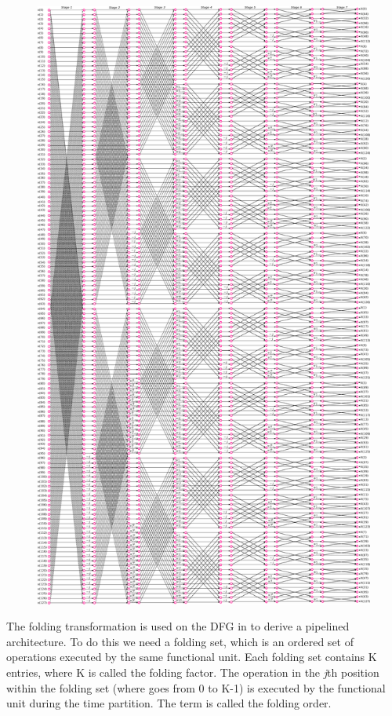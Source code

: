 \documentclass[journal,comsoc]{IEEEtran}
\begin{document}
\begin{figure}[htbp]
	\centering
	\includegraphics[width=\linewidth]{Diagramas/miSeccionFiguras/128PuntosRadix8Conexion.pdf}
	\caption{}
	\label{fig:128puntosradix8conexion}
\end{figure}


The folding transformation is used on the DFG in to derive a pipelined architecture. To do this we need a folding set, which is an ordered set of operations executed by the same functional unit. Each folding set contains K entries, where K is called the folding factor. The operation in the \textit{j}th position within the folding set (where goes from 0 to K-1) is executed by the functional unit during the time partition. The term is called the folding order.
\end{document}
